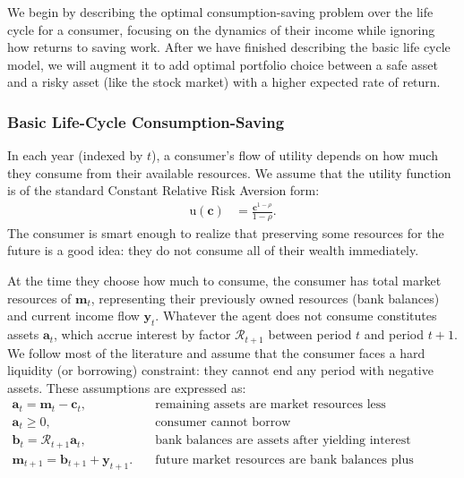 \documentclass{article}
\newcommand{\CRRA}{\rho}
\newcommand{\uFunc}{\mathrm{u}}
\newcommand{\cLvl}{\mathbf{c}}
\newcommand{\mLvl}{\mathbf{m}}
\newcommand{\yLvl}{\mathbf{y}}
\newcommand{\aLvl}{\mathbf{a}}
\newcommand{\Rport}{\mathcal{R}}
\newcommand{\bLvl}{\mathbf{b}}
\begin{document}
We begin by describing the optimal consumption-saving problem over the life cycle for a consumer, focusing on the dynamics of their income while ignoring how returns to saving work.
After we have finished describing the basic life cycle model, we will augment it to add optimal portfolio choice between a safe asset and a risky asset (like the stock market) with a higher expected rate of return.

\subsubsection{Basic Life-Cycle Consumption-Saving}\label{basic-cs}

In each year (indexed by $t$), a consumer's flow of utility depends on how much they consume from their available resources.
We assume that the utility function is of the standard Constant Relative Risk Aversion form:
\begin{align}
    \uFunc(\cLvl) & = \frac{\cLvl^{1-\CRRA}}{1-\CRRA}.
\end{align}
The consumer is smart enough to realize that preserving some resources for the future is a good idea: they do not consume all of their wealth immediately.


At the time they choose how much to consume, the consumer has total market resources of $\mLvl_t$, representing their previously owned resources (bank balances) and current income flow $\yLvl_t$.
Whatever the agent does not consume constitutes assets $\aLvl_t$, which accrue interest by factor $\Rport_{t+1}$ between period $t$ and period $t+1$.
We follow most of the literature and assume that the consumer faces a hard liquidity (or borrowing) constraint: they cannot end any period with negative assets.
These assumptions are expressed as:
\begin{align}
    \aLvl_t = \mLvl_t - \cLvl_t, & \text{~~~remaining assets are market resources less consumption} \\
    \aLvl_t \geq 0, & \text{~~~consumer cannot borrow} \\
    \bLvl_t = \Rport_{t+1} \aLvl_t, & \text{~~~bank balances are assets after yielding interest} \\
    \mLvl_{t+1} = \bLvl_{t+1} + \yLvl_{t+1}. & \text{~~~future market resources are bank balances plus income} \\
\end{align}
\end{document}
